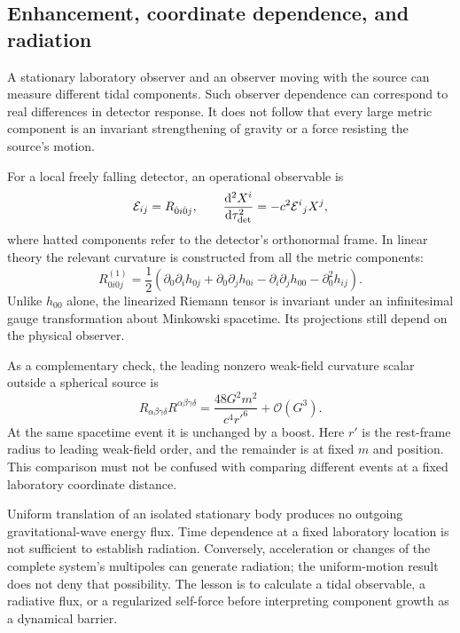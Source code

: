 \documentclass[11pt,a4paper]{article}
\numberwithin{equation}{section}
\newcommand{\dd}{\mathrm{d}}
\newcommand{\Ord}{\mathcal{O}}
\begin{document}
\subsection{Enhancement, coordinate dependence, and radiation}

A stationary laboratory observer and an observer moving with the source can measure different tidal components. Such observer dependence can correspond to real differences in detector response. It does not follow that every large metric component is an invariant strengthening of gravity or a force resisting the source's motion.

For a local freely falling detector, an operational observable is
\begin{equation}
 \mathcal E_{ij}=R_{\hat0 i\hat0 j},\qquad
 \frac{\dd^2 X^i}{\dd\tau_{\rm det}^2}=-c^2\mathcal E^i{}_jX^j,
 \label{eq:tidal}
\end{equation}
where hatted components refer to the detector's orthonormal frame. In linear theory the relevant curvature is constructed from all the metric components:
\begin{equation}
 R_{0i0j}^{(1)}=\frac12\left(
 \partial_0\partial_i h_{0j}+\partial_0\partial_j h_{0i}
 -\partial_i\partial_j h_{00}-\partial_0^2h_{ij}\right).
 \label{eq:curvature}
\end{equation}
Unlike $h_{00}$ alone, the linearized Riemann tensor is invariant under an infinitesimal gauge transformation about Minkowski spacetime. Its projections still depend on the physical observer.

As a complementary check, the leading nonzero weak-field curvature scalar outside a spherical source is
\begin{equation}
 R_{\alpha\beta\gamma\delta}R^{\alpha\beta\gamma\delta}
 =\frac{48G^2m^2}{c^4r'^6}+\Ord(G^3).
 \label{eq:kretschmann}
\end{equation}
At the same spacetime event it is unchanged by a boost. Here $r'$ is the rest-frame radius to leading weak-field order, and the remainder is at fixed $m$ and position. This comparison must not be confused with comparing different events at a fixed laboratory coordinate distance.

Uniform translation of an isolated stationary body produces no outgoing gravitational-wave energy flux. Time dependence at a fixed laboratory location is not sufficient to establish radiation. Conversely, acceleration or changes of the complete system's multipoles can generate radiation; the uniform-motion result does not deny that possibility. The lesson is to calculate a tidal observable, a radiative flux, or a regularized self-force before interpreting component growth as a dynamical barrier.
\end{document}
